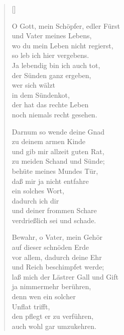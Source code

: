 \begin{multicols}{2}
\settowidth{\versewidth}{der nichts mehr schmeckt, nichts sieht und hört,}
\begin{verse}[\versewidth]

 O Gott, mein Schöpfer, edler Fürst\\
und Vater meines Lebens,\\
wo du mein Leben nicht regierst,\\
so leb ich hier vergebens.\\
Ja lebendig bin ich auch tot,\\
der Sünden ganz ergeben,\\
wer sich wälzt\\
in dem Sündenkot,\\
der hat das rechte Leben\\
noch niemals recht gesehen.

 Darnum so wende deine Gnad\\
zu deinem armen Kinde\\
und gib mir allzeit guten Rat,\\
zu meiden Schand und Sünde;\\
behüte meines Mundes Tür,\\
daß mir ja nicht entfahre\\
ein solches Wort,\\
dadurch ich dir\\
und deiner frommen Schare\\
verdrießlich sei und schade.

 Bewahr, o Vater, mein Gehör\\
auf dieser schnöden Erde\\
vor allem, dadurch deine Ehr\\
und Reich beschimpfet werde;\\
laß mich der Lästrer Gall und Gift\\
ja nimmermehr berühren,\\
denn wen ein solcher\\
Unflat trifft,\\
den pflegt er zu verführen,\\
auch wohl gar umzukehren.


\end{verse}
\end{multicols}
